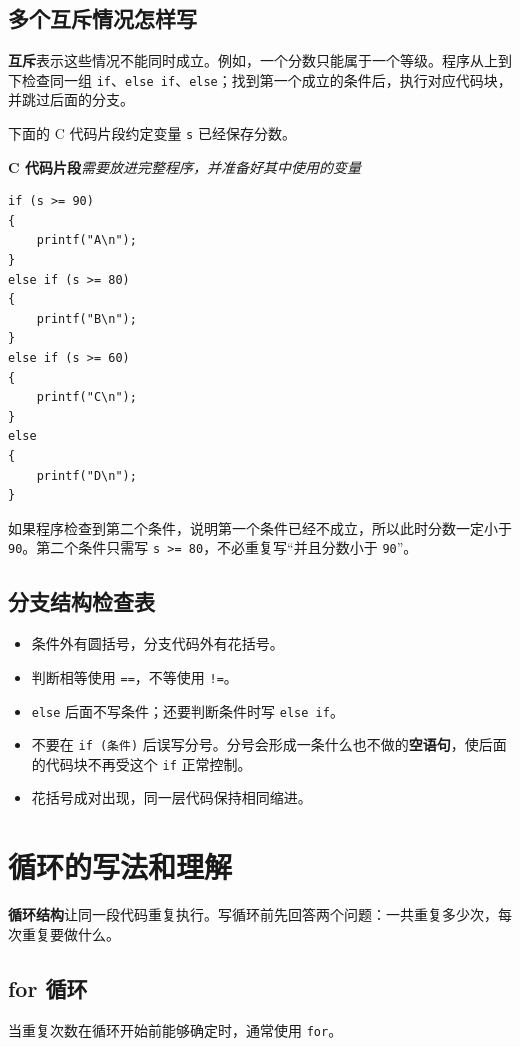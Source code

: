 \documentclass[UTF8,zihao=-4,fontset=windows]{ctexart}
\newcommand{\term}[1]{\textbf{\color{navy}#1}}
\newcommand{\cfragmentlabel}{\noindent\textbf{C 代码片段}\quad\textit{需要放进完整程序，并准备好其中使用的变量}\par\nopagebreak}
\begin{document}
\subsection{多个互斥情况怎样写}

\term{互斥}表示这些情况不能同时成立。例如，一个分数只能属于一个等级。程序从上到下检查同一组 \verb|if|、\verb|else if|、\verb|else|；找到第一个成立的条件后，执行对应代码块，并跳过后面的分支。

下面的 C 代码片段约定变量 \verb|s| 已经保存分数。

\cfragmentlabel
\begin{lstlisting}[style=cstyle]
if (s >= 90)
{
    printf("A\n");
}
else if (s >= 80)
{
    printf("B\n");
}
else if (s >= 60)
{
    printf("C\n");
}
else
{
    printf("D\n");
}
\end{lstlisting}

如果程序检查到第二个条件，说明第一个条件已经不成立，所以此时分数一定小于 \verb|90|。第二个条件只需写 \verb|s >= 80|，不必重复写“并且分数小于 \verb|90|”。

\subsection{分支结构检查表}

\begin{itemize}
  \item 条件外有圆括号，分支代码外有花括号。
  \item 判断相等使用 \verb|==|，不等使用 \verb|!=|。
  \item \verb|else| 后面不写条件；还要判断条件时写 \verb|else if|。
  \item 不要在 \verb|if (条件)| 后误写分号。分号会形成一条什么也不做的\term{空语句}，使后面的代码块不再受这个 \verb|if| 正常控制。
  \item 花括号成对出现，同一层代码保持相同缩进。
\end{itemize}

\section{循环的写法和理解}

\term{循环结构}让同一段代码重复执行。写循环前先回答两个问题：一共重复多少次，每次重复要做什么。

\subsection{for 循环}

当重复次数在循环开始前能够确定时，通常使用 \verb|for|。
\end{document}
